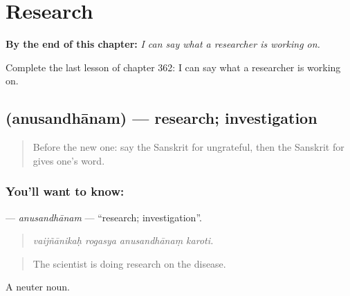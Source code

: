 
\chapter{Research}
\label{ch:sa-research}

\begin{chapteropening}
\textbf{By the end of this chapter:} \emph{I can say what a researcher is working on.}

Complete the last lesson of chapter 362: I can say what a researcher is working on.
\end{chapteropening}

\section[\texorpdfstring{\sk{अनुसन्धानम्} (anusandhānam)}{अनुसन्धानम् (anusandhānam)}]{ (anusandhānam) — research; investigation}

\label{lesson:SA-C362-anusandhanam}



\begin{quote}
Before the new one: say the Sanskrit for ungrateful, then the Sanskrit for gives one's word.
\end{quote}

\subsection*{You'll want to know: }
\textbf{} — \emph{anusandhānam} — \textquotedblleft{}research; investigation\textquotedblright{}.

\begin{quote}
   
\end{quote}

\begin{quote}
\emph{vaijñānikaḥ rogasya anusandhānaṃ karoti.}
\end{quote}

\begin{quote}
The scientist is doing research on the disease.
\end{quote}

A neuter noun.

